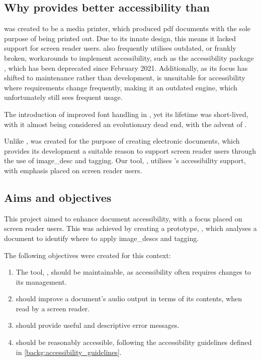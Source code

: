 \subsection{Why \lualatexspaced provides better accessibility than \pdflatex}\label{intro:lualatex_better_pdflatex}
\pdflatexspaced was created to be a media printer, which produced \acrshort{pdf} documents with the sole purpose of being printed out. Due to its innate design, this means it lacked support for screen reader users. \pdflatexspaced also frequently utilises outdated, or frankly broken, workarounds to implement accessibility, such as the accessibility package \parencite{accessibility_package}, which has been deprecated since February 2021. Additionally, as its focus has shifted to maintenance rather than development, \pdflatexspaced is unsuitable for accessibility where requirements change frequently, making it an outdated \texspaced engine, which unfortunately still sees frequent usage.

The introduction of \xetexspaced improved font handling in \latex , yet its lifetime was short-lived, with it almost being considered an evolutionary dead end, with the advent of \lualatex.

Unlike \pdflatex, \lualatexspaced was created for the purpose of creating electronic documents, which provides its development a suitable reason to support screen reader users through the use of \gls{image_desc} and \gls{tagging}. Our tool, \lintex, utilises \lualatex's accessibility support, with emphasis placed on screen reader users.
\subsection{Aims and objectives}
This project aimed to enhance \latexspaced document accessibility, with a focus placed on screen reader users. This was achieved by creating a prototype, \lintex , which analyses a \latexspaced document to identify where to apply \glspl{image_desc} and \gls{tagging}.

The following objectives were created for this context:
\begin{enumerate}[label=\textbf{OBJ\arabic*}]
    \item The tool, \lintex , should be maintainable, as accessibility often requires changes to its management.\label{intro:objective:lintex_maintainable}
    \item \lintexspaced should improve a document's audio output in terms of its contents, when read by a screen reader.\label{intro:objective:audio_output_improved}
    \item \lintexspaced should provide useful and descriptive error messages.\label{intro:objective:errors_useful}
    \item \lintexspaced should be reasonably accessible, following the accessibility guidelines defined in \cref{backg:accessibility_guidelines}.\label{intro:objective:lintex_accessible}
\end{enumerate}

